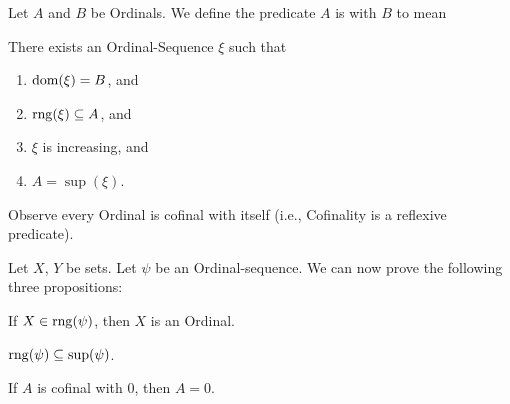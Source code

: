 \documentclass{article}
\begin{document}
\begin{definition}
Let $A$ and $B$ be Ordinals.
We define the predicate $A$ is  with $B$ to mean
\begin{defn}
\item There exists an Ordinal-Sequence $\xi$ such that
  \begin{enumerate}[label=(\roman*)]
  \item $\operatorname{dom}(\xi)=B$, and
  \item $\operatorname{rng}(\xi)\subseteq A$, and
  \item $\xi$ is increasing, and
  \item $A=\sup(\xi)$.
  \end{enumerate}
\end{defn}
Observe every Ordinal is cofinal with itself (i.e., Cofinality is a
reflexive predicate).
\end{definition}

Let $X$, $Y$ be sets. Let $\psi$ be an Ordinal-sequence.
We can now prove the following three propositions:
\begin{thm}
\item\label{ordinal2:48} If $X\in\operatorname{rng}(\psi)$, then $X$ is an Ordinal.
\item\label{ordinal2:49} $\operatorname{rng}(\psi)\subseteq\sup(\psi)$.
\item\label{ordinal2:50} If $A$ is cofinal with 0, then $A=0$.
\end{thm}
\end{document}
